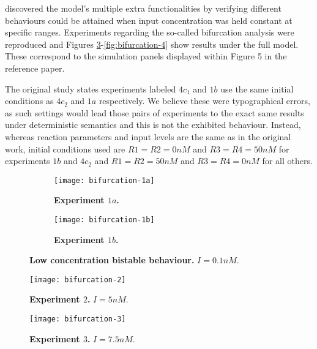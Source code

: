     \citet{multif} discovered the model's multiple extra functionalities by verifying different behaviours could be attained when input concentration was held constant at specific ranges.
    Experiments regarding the so-called bifurcation analysis were reproduced and Figures \ref{fig:bifurcation-1}-\ref{fig:bifurcation-4} show results under the full model.
    These correspond to the simulation panels displayed within Figure 5 in the reference paper.

    The original study states experiments labeled $4c_{1}$ and $1b$ use the same initial conditions as $4c_{2}$ and $1a$ respectively.
    We believe these were typographical errors, as such settings would lead those pairs of experiments to the exact same results under deterministic semantics and this is not the exhibited behaviour.
    Instead, whereas reaction parameters and input levels are the same as in the original work, initial conditions used are $R1=R2=0nM$ and $R3=R4=50nM$ for experiments $1b$ and $4c_{2}$ and $R1=R2=50nM$ and $R3=R4=0nM$ for all others.

    \begin{figure}[!htb]
      \centering
      \begin{subfigure}[t]{0.45\textwidth}
        \centering
        \texttt{[image: bifurcation-1a]}
        \caption{\textbf{Experiment $1a$.}}
        \label{fig:bifurcation-1a}
      \end{subfigure}
      \hfill
      \begin{subfigure}[t]{0.45\textwidth}
        \centering
        \texttt{[image: bifurcation-1b]}
        \caption{\textbf{Experiment $1b$.}}
        \label{fig:bifurcation-1b}
      \end{subfigure}
      \caption{\textbf{Low concentration bistable behaviour.} $I = 0.1 nM$.}
      \label{fig:bifurcation-1}
    \end{figure}

    \begin{figure}[!htb]
      \centering
      \texttt{[image: bifurcation-2]}
      \caption{\textbf{Experiment $2$.} $I = 5 nM$.}
      \label{fig:bifurcation-2}
    \end{figure}

    \begin{figure}[!htb]
      \centering
      \texttt{[image: bifurcation-3]}
      \caption{\textbf{Experiment $3$.} $I = 7.5nM$.}
      \label{fig:bifurcation-3}
    \end{figure}

